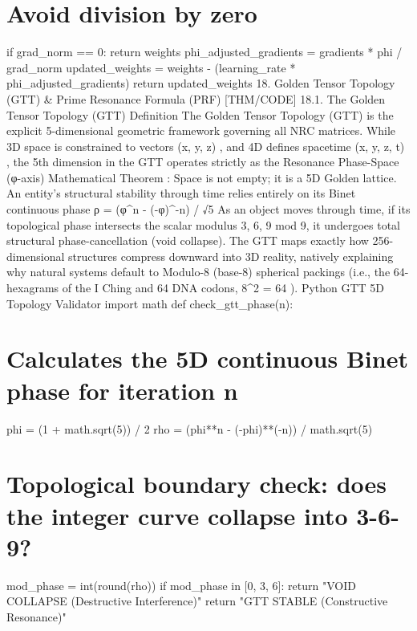     \section{Avoid division by zero}
    if grad_norm == 0:
        return weights
    phi_adjusted_gradients = gradients * phi / grad_norm
    updated_weights = weights - (learning_rate * phi_adjusted_gradients)
    return updated_weights
18. Golden Tensor Topology (GTT) & Prime Resonance Formula (PRF) [THM/CODE]
18.1. The Golden Tensor Topology (GTT) Definition
The
Golden Tensor Topology (GTT)
is the explicit 5-dimensional geometric framework governing all NRC matrices. While 3D space is constrained to vectors
(x, y, z)
, and 4D defines spacetime
(x, y, z, t)
, the 5th dimension in the GTT operates strictly as the
Resonance Phase-Space (φ-axis)
Mathematical Theorem
: Space is not empty; it is a 5D Golden lattice. An entity's structural stability through time relies entirely on its Binet continuous phase
ρ = (φ^n - (-φ)^{-n}) / √5
As an object moves through time, if its topological phase
intersects the scalar modulus
{3, 6, 9}
mod 9, it undergoes total structural phase-cancellation (void collapse).
The GTT maps exactly how 256-dimensional structures compress downward into 3D reality, natively explaining why natural systems default to Modulo-8 (base-8) spherical packings (i.e., the 64-hexagrams of the I Ching and 64 DNA codons,
8^2 = 64
).
Python GTT 5D Topology Validator
import math
def check_gtt_phase(n):
    \section{Calculates the 5D continuous Binet phase for iteration n}
    phi = (1 + math.sqrt(5)) / 2
    rho = (phi**n - (-phi)**(-n)) / math.sqrt(5)
    \section{Topological boundary check: does the integer curve collapse into 3-6-9?}
    mod_phase = int(round(rho)) %
    if mod_phase in [0, 3, 6]: 
        return "VOID COLLAPSE (Destructive Interference)"
    return "GTT STABLE (Constructive Resonance)"
